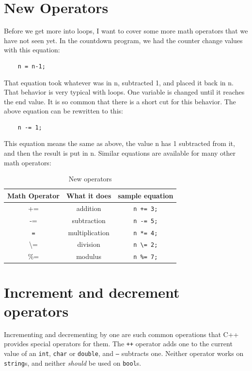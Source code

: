 \section{New Operators}
Before we get more into loops, I want to cover some more math operators that we have not seen yet. In the countdown program, we had the counter change values with this equation:
\begin{verbatim}
    n = n-1;
\end{verbatim}
That equation took whatever was in n, subtracted 1, and placed it back in n. That behavior is very typical with loops. One variable 
is changed until it reaches the end value. It is so common that there is a short cut for this behavior. The above equation can be rewritten to this:
\begin{verbatim}
    n -= 1;
\end{verbatim}
This equation means the same as above, the value n has 1 subtracted from it, and then the result is put in n. Similar equations are available for many other math operators:
\begin{table}[h]
    \centering
    \begin{tabular}{|c|c|c|}
    \hline
 Math Operator & What it does & sample equation \\\hline
    +=     &  addition & {\tt n += 3;} \\
    -=      & subtraction & {\tt n -= 5;}\\
    {\tt *=}  &   multiplication & {\tt n *= 4;} \\
    \textbackslash=  &    division  & {\tt n \textbackslash= 2;}\\
    \%=  &  modulus & {\tt n \%= 7;}\\
\hline
    \end{tabular}
    \caption{New operators}
    \label{tab:newoperators}
\end{table}
\section{Increment and decrement operators}

Incrementing and decrementing by one are such common operations that C++
provides special operators for them.  The {\tt ++} operator adds one
to the current value of an {\tt int}, {\tt char} or {\tt double}, and
{\tt --} subtracts one.  Neither operator works on {\tt string}s,
and neither {\em should} be used on {\tt bool}s.

